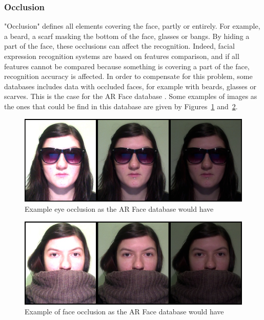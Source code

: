 \subsubsection{Occlusion}

\vspace{\baselineskip}
\noindent "Occlusion" defines all elements covering the face, partly or entirely. For example, a beard, a scarf masking the bottom of the face, glasses or bangs. By hiding a part of the face, these occlusions can affect the recognition. Indeed, facial expression recognition systems are based on features comparison, and if all  features cannot be compared because something is covering a part of the face, recognition accuracy is affected. In order to compensate for this problem, some databases includes data with occluded faces, for example with beards, glasses or scarves. This is the case for the AR Face database \cite{ARFACE}. Some examples of images as the ones that could be find in this database are given by Figures~\ref{arface_example2} and~\ref{arface_example3}.
\newline

\begin{figure}[!h]
\begin{center}
\noindent \includegraphics[scale=0.3]{figures/arface_example2} 
\newline
\caption{Example eye occlusion as the AR Face database would have}
\label{arface_example2}
\end{center} 
\end{figure}

\begin{figure}[!h]
\begin{center}
\noindent \includegraphics[scale=0.3]{figures/arface_example3} 
\newline
\caption{Example of face occlusion as the AR Face database would have}
\label{arface_example3}
\end{center} 
\end{figure} 

